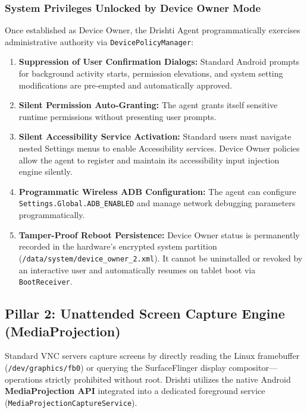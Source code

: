 \documentclass[11pt,a4paper]{article}
\begin{document}
\subsubsection{System Privileges Unlocked by Device Owner Mode}
Once established as Device Owner, the Drishti Agent programmatically exercises administrative authority via \texttt{DevicePolicyManager}:
\begin{enumerate}[leftmargin=*]
    \item \textbf{Suppression of User Confirmation Dialogs:} Standard Android prompts for background activity starts, permission elevations, and system setting modifications are pre-empted and automatically approved.
    \item \textbf{Silent Permission Auto-Granting:} The agent grants itself sensitive runtime permissions without presenting user prompts.
    \item \textbf{Silent Accessibility Service Activation:} Standard users must navigate nested Settings menus to enable Accessibility services. Device Owner policies allow the agent to register and maintain its accessibility input injection engine silently.
    \item \textbf{Programmatic Wireless ADB Configuration:} The agent can configure \texttt{Settings.Global.ADB\_ENABLED} and manage network debugging parameters programmatically.
    \item \textbf{Tamper-Proof Reboot Persistence:} Device Owner status is permanently recorded in the hardware's encrypted system partition (\texttt{/data/system/device\_owner\_2.xml}). It cannot be uninstalled or revoked by an interactive user and automatically resumes on tablet boot via \texttt{BootReceiver}.
\end{enumerate}

\subsection{Pillar 2: Unattended Screen Capture Engine (MediaProjection)}
Standard VNC servers capture screens by directly reading the Linux framebuffer (\texttt{/dev/graphics/fb0}) or querying the SurfaceFlinger display compositor---operations strictly prohibited without root. Drishti utilizes the native Android \textbf{MediaProjection API} integrated into a dedicated foreground service (\texttt{MediaProjectionCaptureService}).
\end{document}
